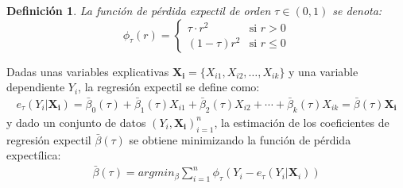 \documentclass[11pt]{book}
\theoremstyle{plain} %
\newtheorem{definition}{Definición}
\theoremstyle{definition} %
\begin{document}
\begin{definition}
   La función de pérdida expectil de orden $\tau \in (0, 1)$ se denota: 
   \begin{equation}
      \phi_{\tau}(r) = 
      \begin{cases}
            \tau \cdot  r^2 & \text{si } r > 0 \\
            (1 - \tau)r^2 & \text{si } r \leq 0
      \end{cases}
      \label{eq:expectil_loss_function}
   \end{equation}
\end{definition}

Dadas unas variables explicativas $\mathbf{X_i} = \{X_{i1}, X_{i2}, \dots, X_{ik}\}$ y 
una variable dependiente $Y_i$, la regresión expectil se define como:
\begin{align*}
    e_\tau(Y_i|\mathbf{X_i})= \bar{\beta}_{0}(\tau)+ \bar{\beta}_{1}(\tau)X_{i1}+ \bar{\beta}_{2}(\tau)X_{i2}+\cdots +  \bar{\beta}_{k}(\tau)X_{ik} = \bar{\beta}(\tau)  \mathbf{X_i}
\end{align*}
y dado un conjunto de datos $(Y_i, \mathbf{X_i})_{i=1}^n$, la estimación de los
coeficientes de regresión expectil $\bar{\beta}(\tau)$ se obtiene minimizando la
función de pérdida expectílica:
\begin{align*}
    \bar{\beta}(\tau) = argmin_{\beta}\sum_{i=1}^n\phi_{\tau}(Y_i-e_{\tau}(Y_i|\mathbf{X}_i))
\end{align*}
\end{document}
